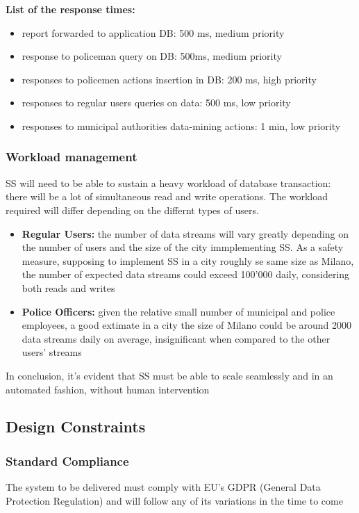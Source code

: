 \textbf{List of the response times:}
\begin{itemize}
\item report forwarded to application DB: 500 ms, medium priority
\item response to policeman query on DB: 500ms, medium priority
\item responses to policemen actions insertion in DB: 200 ms, high priority
\item responses to regular users queries on data: 500 ms, low priority
\item responses to municipal authorities data-mining actions: 1 min, low priority
\end{itemize}
\subsubsection{Workload management}
SS will need to be able to sustain a heavy workload of database transaction: there will be a lot of simultaneous read and write operations. The workload required will differ depending on the differnt types of users.
\begin{itemize}
	\item \textbf{Regular Users:} the number of data streams will vary greatly depending on the number of users and the size of the city immplementing SS. As a safety measure, supposing to implement SS in a city roughly se same size as Milano, the number of expected data streams could exceed 100'000 daily, considering both reads and writes
	\item \textbf{Police Officers: } given the relative small number of municipal and police employees, a good extimate in a city the size of Milano could be around 2000 data streams daily on average, insignificant when compared to the other users' streams  
\end{itemize}
In conclusion, it's evident that SS must be able to scale seamlessly and in an automated fashion, without human intervention


\subsection{Design Constraints}
	\subsubsection{Standard Compliance}
	The system to be delivered must comply with EU's GDPR (General Data Protection Regulation) and will follow any of its variations in the time to come

